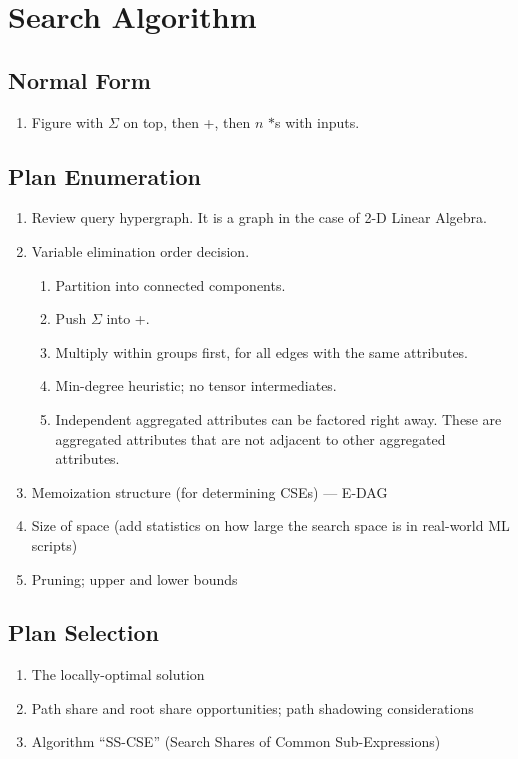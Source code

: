 \documentclass{vldb}
\begin{document}
\section{Search Algorithm}

\subsection{Normal Form}
\begin{enumerate}
\item Figure with $\Sigma$ on top, then +, then $n$ $*$s with inputs.
\end{enumerate}

\subsection{Plan Enumeration}
\begin{enumerate}
\item Review query hypergraph. It is a graph in the case of 2-D Linear Algebra.
\item Variable elimination order decision.
  \begin{enumerate}
  \item Partition into connected components.
  \item Push $\Sigma$ into +.
  \item Multiply within groups first, for all edges with the same attributes.
  \item Min-degree heuristic; no tensor intermediates.
  \item Independent aggregated attributes can be factored right away. These are aggregated attributes that are not adjacent to other aggregated attributes.
  \end{enumerate}
\item Memoization structure (for determining CSEs) --- E-DAG
\item Size of space (add statistics on how large the search space is in real-world ML scripts)
\item Pruning; upper and lower bounds
\end{enumerate}

\subsection{Plan Selection}
\begin{enumerate}
\item The locally-optimal solution
\item Path share and root share opportunities; path shadowing considerations
\item Algorithm ``SS-CSE'' (Search Shares of Common Sub-Expressions)
\end{enumerate}
\end{document}
